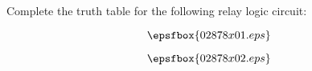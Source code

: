 

Complete the truth table for the following relay logic circuit:

$$\epsfbox{02878x01.eps}$$







$$\epsfbox{02878x02.eps}$$











